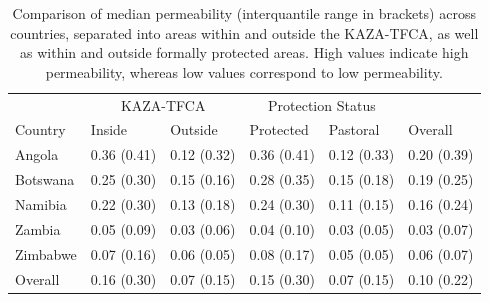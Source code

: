 \documentclass[abstract=on,10pt,a4paper,bibliography=totocnumbered]{article}
\begin{document}
\begin{table}[h]
  \begin{center}
  \caption{Comparison of median permeability (interquantile range in brackets)
  across countries, separated into areas within and outside the KAZA-TFCA, as
  well as within and outside formally protected areas. High values indicate high
  permeability, whereas low values correspond to low permeability.}
  \label{PermeabilityComp}
  \begin{tabular}{llllll}
    \toprule
    \multicolumn{1}{c}{} & \multicolumn{2}{c}{KAZA-TFCA} &
    \multicolumn{2}{c}{Protection Status} & \multicolumn{1}{c}{} \\
    \cmidrule(l{3pt}r{3pt}){2-3} \cmidrule(l{3pt}r{3pt}){4-5}
    Country & Inside & Outside & Protected & Pastoral & Overall\\
    \midrule
    Angola & 0.36 (0.41) & 0.12 (0.32) & 0.36 (0.41) & 0.12 (0.33) & 0.20 (0.39)\\
    Botswana & 0.25 (0.30) & 0.15 (0.16) & 0.28 (0.35) & 0.15 (0.18) & 0.19 (0.25)\\
    Namibia & 0.22 (0.30) & 0.13 (0.18) & 0.24 (0.30) & 0.11 (0.15) & 0.16 (0.24)\\
    Zambia & 0.05 (0.09) & 0.03 (0.06) & 0.04 (0.10) & 0.03 (0.05) & 0.03 (0.07)\\
    Zimbabwe & 0.07 (0.16) & 0.06 (0.05) & 0.08 (0.17) & 0.05 (0.05) & 0.06 (0.07)\\
    \hline
    Overall & 0.16 (0.30) & 0.07 (0.15) & 0.15 (0.30) & 0.07 (0.15) & 0.10 (0.22)\\
    \bottomrule
  \end{tabular}
  \end{center}
\end{table}
\end{document}
